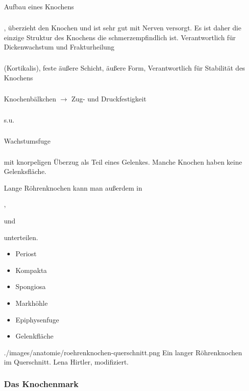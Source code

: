 
{Aufbau eines Knochens}
{%
\subparagraph{} , überzieht den Knochen und
ist sehr gut mit Nerven versorgt. Es ist daher die einzige Struktur des Knochens die
schmerzempfindlich ist. Verantwortlich für Dickenwachstum und Frakturheilung
\subparagraph{} (Kortikalis),
feste äußere Schicht,
äußere Form, Verantwortlich für Stabilität des Knochens
\subparagraph{} Knochenbälkchen
${\rightarrow}$ Zug- und Druckfestigkeit
\subparagraph{} s.u.
\subparagraph{} Wachstumsfuge
\subparagraph{} mit knorpeligen Überzug als Teil eines Gelenkes.
Manche Knochen haben keine Gelenksfläche.


Lange Röhrenknochen kann man außerdem in 
\begin{inparaitem}
    \item {},
    \item {} und
    \item {} 
\end{inparaitem}
unterteilen.
}{
\begin{itemize}
  \item Periost
  \item Kompakta
  \item Spongiosa
  \item Markhöhle
  \item Epiphysenfuge
  \item Gelenkfläche
\end{itemize}
}
{./images/anatomie/roehrenknochen-querschnitt.png}
{Ein langer Röhrenknochen im Querschnitt.}
{Lena Hirtler, modifiziert.}

\subsubsection{Das Knochenmark}



